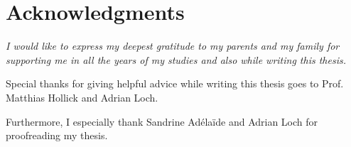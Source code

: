




\bigskip

\begingroup
\let\clearpage\relax
\let\cleardoublepage\relax
\let\cleardoublepage\relax
\chapter*{Acknowledgments}
{\slshape 
I would like to express my deepest gratitude to my parents and my family for supporting me in all the years of my studies and also while writing this thesis.

\bigskip

Special thanks for giving helpful advice while writing this thesis goes to Prof. Matthias Hollick and Adrian Loch.

\bigskip

Furthermore, I especially thank Sandrine Adéla\"ide and Adrian Loch for proofreading my thesis.
}

\endgroup
